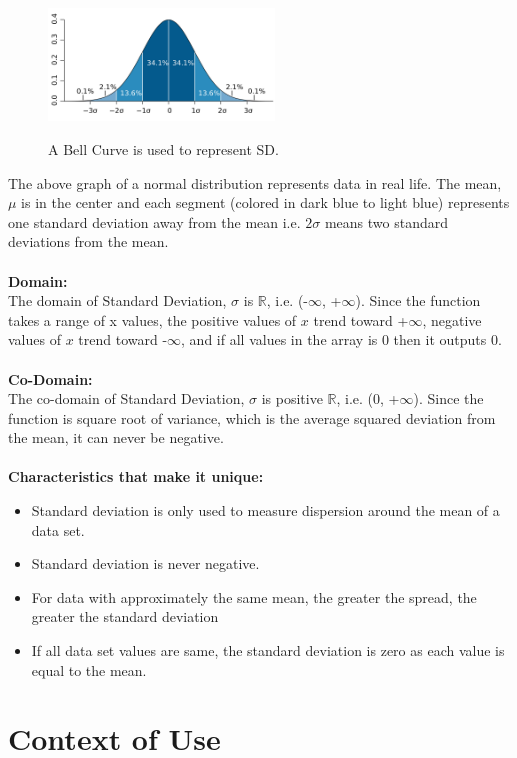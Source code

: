 \documentclass[12pt,letterpaper]{report}
\begin{document}
\begin{figure}[h]
 \centering
 \includegraphics[width= 6cm]{images/Standarddev.png}
  \caption{A Bell Curve is used to represent SD.}\cite{definition}
\end{figure}

\normalsize{The above graph of a normal distribution represents data in real life. The mean, $\mu$ is in the center and each segment (colored in dark blue to light blue) represents one standard deviation away from the mean i.e. $2\sigma$ means two standard deviations from the mean.\cite{Graph}
\\\\
\textbf{Domain:}\\
The domain of Standard Deviation, $\sigma$ is $\mathbb{R}$, i.e. (-$\infty$, +$\infty$). Since the function takes a range of x values, the positive values of $x$ trend toward +$\infty$, negative values of $x$ trend toward -$\infty$, and if all values in the array is 0 then it outputs 0. 
\\
\\\textbf{Co-Domain:}\\
The co-domain of Standard Deviation, $\sigma$ is positive $\mathbb{R}$, i.e. (0, +$\infty$). Since the function is square root of variance, which is the average squared deviation from the mean, it can never be negative.\cite{negativevalues}
\\
\\\textbf{Characteristics that make it unique:}
\begin{itemize}
  \item 	Standard deviation is only used to measure dispersion around the mean of a data set.
  \item  	Standard deviation is never negative. 
  \item 	For data with approximately the same mean, the greater the spread, the greater the standard deviation
  \item     If all data set values are same, the standard deviation is zero as each value is equal to the mean. 
\end{itemize}}

{\let\clearpage\relax \chapter{Context of Use}}
 
\end{document}

